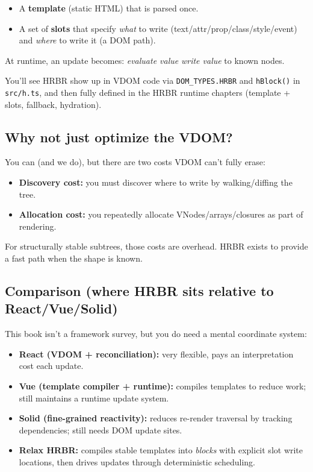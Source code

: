 \begin{itemize}
  \item A \textbf{template} (static HTML) that is parsed once.
  \item A set of \textbf{slots} that specify \emph{what} to write (text/attr/prop/class/style/event) and \emph{where} to write it (a DOM path).
\end{itemize}

At runtime, an update becomes: \emph{evaluate value} \textrightarrow \emph{write value} to known nodes.

You'll see HRBR show up in VDOM code via \texttt{DOM\_TYPES.HRBR} and \texttt{hBlock()} in \texttt{src/h.ts},
and then fully defined in the HRBR runtime chapters (template + slots, fallback, hydration).

\subsection{Why not just optimize the VDOM?}

You can (and we do), but there are two costs VDOM can't fully erase:

\begin{itemize}
  \item \textbf{Discovery cost:} you must discover where to write by walking/diffing the tree.
  \item \textbf{Allocation cost:} you repeatedly allocate VNodes/arrays/closures as part of rendering.
\end{itemize}

For structurally stable subtrees, those costs are overhead.
HRBR exists to provide a fast path when the shape is known.

\subsection{Comparison (where HRBR sits relative to React/Vue/Solid)}

This book isn't a framework survey, but you do need a mental coordinate system:

\begin{itemize}
  \item \textbf{React (VDOM + reconciliation):} very flexible, pays an interpretation cost each update.
  \item \textbf{Vue (template compiler + runtime):} compiles templates to reduce work; still maintains a runtime update system.
  \item \textbf{Solid (fine-grained reactivity):} reduces re-render traversal by tracking dependencies; still needs DOM update sites.
  \item \textbf{Relax HRBR:} compiles stable templates into \emph{blocks} with explicit slot write locations, then drives updates through deterministic scheduling.
\end{itemize}

